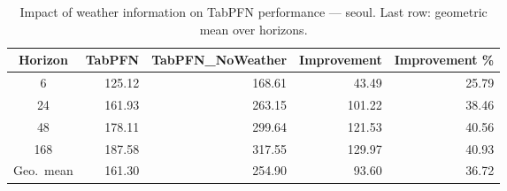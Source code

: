 \begin{table}
\centering
\caption{Impact of weather information on TabPFN performance — seoul. Last row: geometric mean over horizons.}
\label{tab:tabpfn_weather_seoul}
\begin{tabular}{crrrr}
\toprule
Horizon & TabPFN & TabPFN\_NoWeather & Improvement & Improvement \% \\
\midrule
6 & 125.12 & 168.61 & 43.49 & 25.79 \\
24 & 161.93 & 263.15 & 101.22 & 38.46 \\
48 & 178.11 & 299.64 & 121.53 & 40.56 \\
168 & 187.58 & 317.55 & 129.97 & 40.93 \\
\midrule
Geo.\ mean & 161.30 & 254.90 & 93.60 & 36.72 \\
\bottomrule
\end{tabular}
\end{table}
